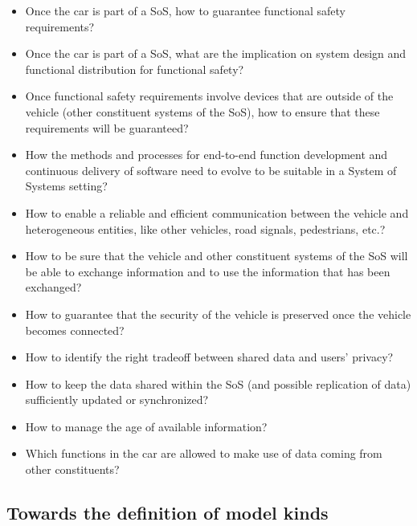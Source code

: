 \begin{itemize}
\item Once the car is part of a SoS, how to guarantee functional safety requirements?

\item Once the car is part of a SoS, what are the implication on system design and functional
distribution for functional safety?

\item Once functional safety requirements involve devices that are outside of the vehicle (other constituent systems of the SoS), how to ensure that these requirements will be
guaranteed?

\item How the methods and processes for end-to-end function development and continuous
delivery of software need to evolve to be suitable in a System of Systems setting?

\item How to enable a reliable and efficient communication between the vehicle and heterogeneous entities, like other vehicles, road signals, pedestrians, etc.?

\item How to be sure that the vehicle and other constituent systems of the SoS will be able to exchange information and to use the information that has been exchanged?

\item How to guarantee that the security of the vehicle is preserved once the vehicle becomes
connected?

\item How to identify the right tradeoff between shared data and users' privacy?

\item How to keep the data shared within the SoS (and possible replication of data) sufficiently updated or synchronized?

\item How to manage the age of available information?

\item Which functions in the car are allowed to make use of data coming from other constituents?
\end{itemize}

\subsection{Towards the definition of model kinds}

